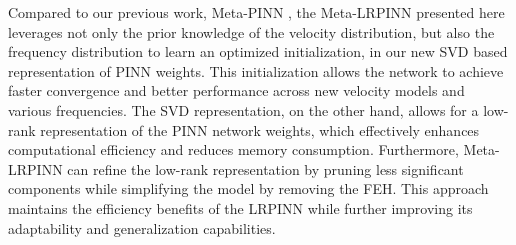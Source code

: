 Compared to our previous work, Meta-PINN \citep{cheng2025meta}, the Meta-LRPINN presented here leverages not only the prior knowledge of the velocity distribution, but also the frequency distribution to learn an optimized initialization, in our new SVD based representation of PINN weights. This initialization allows the network to achieve faster convergence and better performance across new velocity models and various frequencies. The SVD representation, on the other hand, allows for a low-rank representation of the PINN network weights, which effectively enhances computational efficiency and reduces memory consumption. Furthermore, Meta-LRPINN can refine the low-rank representation by pruning less significant components while simplifying the model by removing the FEH. This approach maintains the efficiency benefits of the LRPINN while further improving its adaptability and generalization capabilities. 

